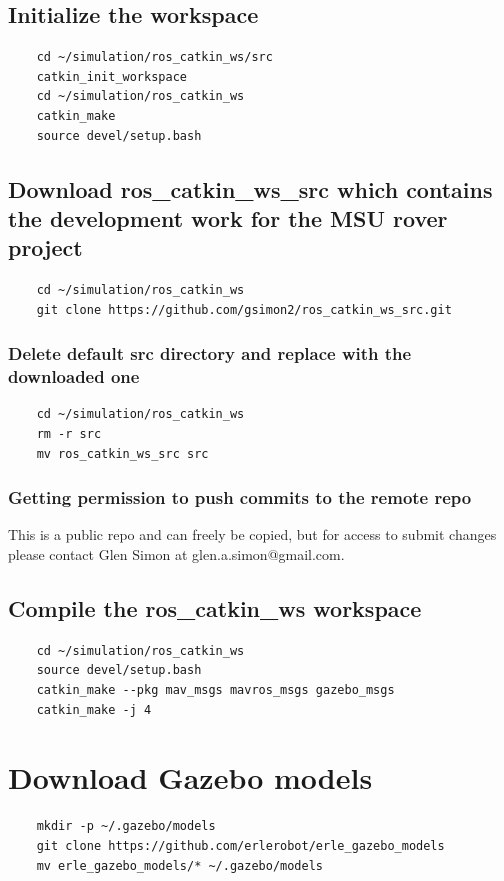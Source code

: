 \documentclass{report}
\begin{document}
\subsection{Initialize the workspace}
\begin{lstlisting}
	cd ~/simulation/ros_catkin_ws/src
	catkin_init_workspace
	cd ~/simulation/ros_catkin_ws
	catkin_make
	source devel/setup.bash
\end{lstlisting}

\subsection{Download ros\_catkin\_ws\_src which contains the development work for the MSU rover project}
\begin{lstlisting}
	cd ~/simulation/ros_catkin_ws
	git clone https://github.com/gsimon2/ros_catkin_ws_src.git
\end{lstlisting}

\subsubsection{Delete default src directory and replace with the downloaded one}
\begin{lstlisting}
	cd ~/simulation/ros_catkin_ws
	rm -r src
	mv ros_catkin_ws_src src
\end{lstlisting}

\subsubsection{Getting permission to push commits to the remote repo}
This is a public repo and can freely be copied, but for access to submit changes please contact Glen Simon at glen.a.simon@gmail.com.

\subsection{Compile the ros\_catkin\_ws workspace}
\begin{lstlisting}
	cd ~/simulation/ros_catkin_ws
	source devel/setup.bash
	catkin_make --pkg mav_msgs mavros_msgs gazebo_msgs
	catkin_make -j 4
\end{lstlisting}

\section{Download Gazebo models}
\begin{lstlisting}
	mkdir -p ~/.gazebo/models
	git clone https://github.com/erlerobot/erle_gazebo_models
	mv erle_gazebo_models/* ~/.gazebo/models
\end{lstlisting}
\end{document}
